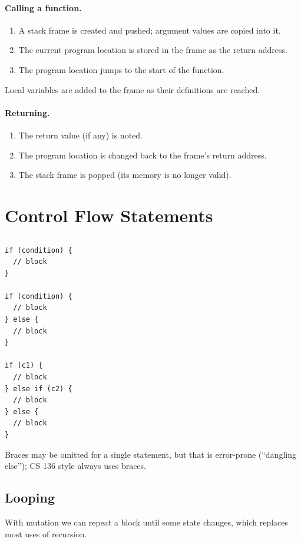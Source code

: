 \paragraph{Calling a function.}
\begin{enumerate}
  \item A stack frame is created and pushed; argument values are copied into it.
  \item The current program location is stored in the frame as the return address.
  \item The program location jumps to the start of the function.
\end{enumerate}
Local variables are added to the frame as their definitions are reached.

\paragraph{Returning.}
\begin{enumerate}
  \item The return value (if any) is noted.
  \item The program location is changed back to the frame's return address.
  \item The stack frame is popped (its memory is no longer valid).
\end{enumerate}

\section{Control Flow Statements}

\subsection{}
\begin{lstlisting}[style=c]
if (condition) {
  // block
}

if (condition) {
  // block
} else {
  // block
}

if (c1) {
  // block
} else if (c2) {
  // block
} else {
  // block
}
\end{lstlisting}
Braces may be omitted for a single statement, but that is error-prone (``dangling else''); CS 136
style always uses braces.

\subsection{Looping}

With mutation we can repeat a block until some state changes, which replaces most uses of
recursion.

